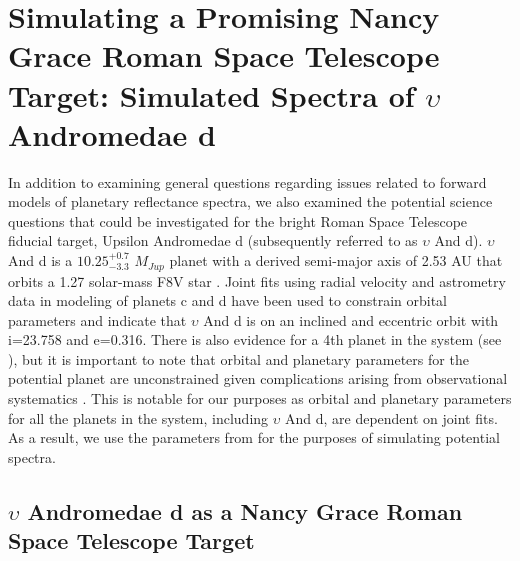 \documentclass[12pt, letterpaper]{aastex631}
\begin{document}
\section{Simulating a Promising Nancy Grace Roman Space Telescope Target: Simulated Spectra of $\upsilon$ Andromedae d} \label{sec:UpsAndd}

In addition to examining general questions regarding issues related to forward models of planetary reflectance spectra, we also examined the potential science questions that could be investigated for the bright Roman Space Telescope fiducial target, Upsilon Andromedae d (subsequently referred to as $\upsilon$ And d). $\upsilon$ And d is a $10.25^{+0.7}_{-3.3}$ $M_{Jup}$ planet \citep{2010ApJ...715.1203M} with a derived semi-major axis of 2.53 AU that orbits a 1.27 solar-mass F8V star \citep{1998A&A...336..942F}.  Joint fits using radial velocity and astrometry data in modeling \citep{2010ApJ...715.1203M} of planets c and d have been used to constrain orbital parameters and indicate that $\upsilon$ And d is on an inclined and eccentric orbit with i=23.758 and e=0.316. There is also evidence for a 4th planet in the system (see \textcite{2010ApJ...715.1203M, refId0}), but it is important to note that orbital and planetary parameters for the potential planet are unconstrained given complications arising from observational systematics \citep{2015ApJ...798...46D}.  This is notable for our purposes as orbital and planetary parameters for all the planets in the system, including $\upsilon$ And d, are dependent on joint fits. As a result, we use the parameters from \textcite{2015ApJ...798...46D} for the purposes of simulating potential spectra. 

\subsection{$\upsilon$ Andromedae d as a Nancy Grace Roman Space Telescope Target} \label{subsec:UpsAnddNGRST}
\end{document}
